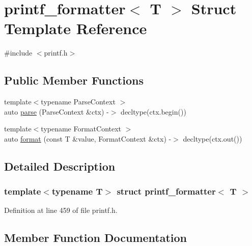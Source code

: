 \hypertarget{structprintf__formatter}{}\section{printf\+\_\+formatter$<$ T $>$ Struct Template Reference}
\label{structprintf__formatter}


{\ttfamily \#include $<$printf.\+h$>$}

\subsection*{Public Member Functions}
\begin{DoxyCompactItemize}
\item 
{\footnotesize template$<$typename Parse\+Context $>$ }\\auto \hyperlink{structprintf__formatter_ad4ca7b204b381a7fdb7c4a94952217b3}{parse} (Parse\+Context \&ctx) -\/$>$ decltype(ctx.\+begin())
\item 
{\footnotesize template$<$typename Format\+Context $>$ }\\auto \hyperlink{structprintf__formatter_a339e8b7c2916129b1e1001bfd68fe584}{format} (const T \&value, Format\+Context \&ctx) -\/$>$ decltype(ctx.\+out())
\end{DoxyCompactItemize}


\subsection{Detailed Description}
\subsubsection*{template$<$typename T$>$\newline
struct printf\+\_\+formatter$<$ T $>$}



Definition at line 459 of file printf.\+h.



\subsection{Member Function Documentation}
\mbox{\label{structprintf__formatter_a339e8b7c2916129b1e1001bfd68fe584}} 
